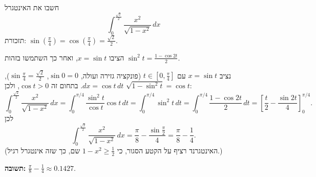 
\begin{question}
חשבו את האינטגרל
\[ \int_0^{\frac{\sqrt2}{2}} \frac{x^2}{\sqrt{1 - x^2}}\,dx \]
תזכורת: $\sin(\frac\pi4) = \cos(\frac\pi4) = \frac{\sqrt2}{2}$.
\end{question}

\begin{hint}
הציבו $x = \sin t$, ואחר כך השתמשו בזהות $\sin^2 t = \frac{1 - \cos 2t}{2}$.
\end{hint}

\begin{solution}
נציב $x = \sin t$ עם $t\in[0,\frac\pi4]$ (פונקציה גזירה ועולה, $\sin 0 = 0$, $\sin\frac\pi4 = \frac{\sqrt2}2$), $dx = \cos t\,dt$.
בתחום זה $\cos t > 0$, ולכן $\sqrt{1 - \sin^2 t} = \cos t$:
\[ \int_0^{\frac{\sqrt2}{2}}\frac{x^2}{\sqrt{1-x^2}}\,dx = \int_0^{\pi/4}\frac{\sin^2 t}{\cos t}\cos t\,dt = \int_0^{\pi/4}\sin^2 t\,dt
= \int_0^{\pi/4}\frac{1 - \cos 2t}{2}\,dt = \left[\frac t2 - \frac{\sin 2t}{4}\right]_0^{\pi/4}. \]
לכן
\[ \int_0^{\frac{\sqrt2}{2}}\frac{x^2}{\sqrt{1-x^2}}\,dx = \frac\pi8 - \frac{\sin\frac\pi2}{4} = \frac{\pi}{8} - \frac14. \]
(האינטגרנד רציף על הקטע הסגור, כי $1 - x^2 \ge \frac12$ שם, כך שזה אינטגרל רגיל.)

\textbf{תשובה:} $\frac\pi8 - \frac14 \approx 0.1427$.
\end{solution}
